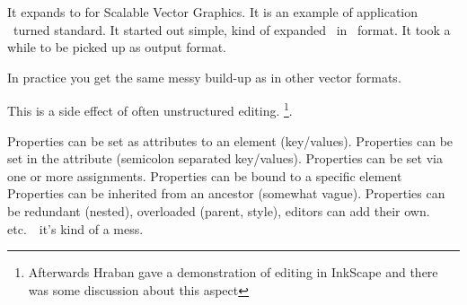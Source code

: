 

\startdocument
  [title={SVG GRAPHICS},
   banner={some demos and discussion},
   location={context\enspace {\bf 2020}\enspace meeting}]

\starttitle[title=Wrapup]

\startitemize

\startitem
    It expands to for Scalable Vector Graphics.
\stopitem
\startitem
    It is an example of application \XML\ turned standard.
\stopitem
\startitem
    It started out simple, kind of expanded \POSTSCRIPT\ in \XML\ format.
\stopitem
\startitem
    It took a while to be picked up as output format.
\stopitem

\blank[2*line]

\startitem
    In practice you get the same messy build-up as in other vector formats.
\stopitem

\startitem
    This is a side effect of often unstructured editing. \footnote {Afterwards
    Hraban gave a demonstration of editing in InkScape and there was some
    discussion about this aspect}.
\stopitem

\stopitemize

\stoptitle

\starttitle[title=Properties]

\startitemize

\startitem
    Properties can be set as attributes to an element (key/values).
\stopitem
\startitem
    Properties can be set in the  attribute (semicolon separated key/values).
\stopitem
\startitem
    Properties can be set via one or more  assignments.
\stopitem
\startitem
    Properties can be bound to a specific element
\stopitem
\startitem
    Properties can be inherited from an ancestor (somewhat vague).
\stopitem
\startitem
    Properties can be redundant (nested), overloaded (parent, style), editors can
    add their own. etc.\ \unknown\ it's kind of a mess.
\stopitem

\stopitemize

\stoptitle

\starttitle[title=Side effects]

\startbuffer
\usemodule[gnuplot]



